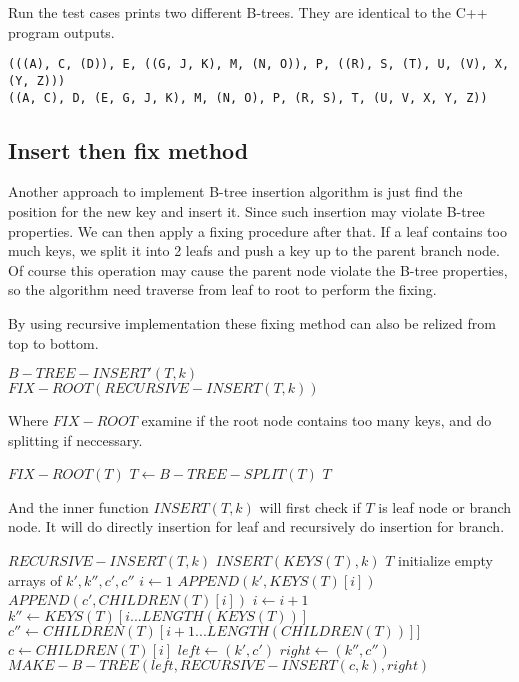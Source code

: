 \documentclass{article}
\begin{document}
Run the test cases prints two different B-trees. They are identical 
to the C++ program outputs.

\begin{verbatim}
(((A), C, (D)), E, ((G, J, K), M, (N, O)), P, ((R), S, (T), U, (V), X, (Y, Z)))
((A, C), D, (E, G, J, K), M, (N, O), P, (R, S), T, (U, V, X, Y, Z))
\end{verbatim}

\subsection{Insert then fix method}
Another approach to implement B-tree insertion algorithm is just find
the position for the new key and insert it. Since such insertion may
violate B-tree properties. We can then apply a fixing procedure after
that. If a leaf contains too much keys, we split it into 2 leafs and
push a key up to the parent branch node. Of course this operation
may cause the parent node violate the B-tree properties, so the 
algorithm need traverse from leaf to root to perform the fixing.

By using recursive implementation these fixing method can also be
relized from top to bottom.

\begin{algorithmic}
\STATE $B-TREE-INSERT'(T, k)$
  \RETURN $FIX-ROOT(RECURSIVE-INSERT(T, k))$
\end{algorithmic}

Where $FIX-ROOT$ examine if the root node contains too many keys,
and do splitting if neccessary.

\begin{algorithmic}
\STATE $FIX-ROOT(T)$
    \STATE $T \leftarrow B-TREE-SPLIT(T)$
  \ENDIF
  \RETURN $T$
\end{algorithmic}

And the inner function $INSERT(T, k)$ will first check if $T$ 
is leaf node or branch node. It will do directly insertion for leaf
and recursively do insertion for branch.

\begin{algorithmic}
\STATE $RECURSIVE-INSERT(T, k)$
    \STATE $INSERT(KEYS(T), k)$
    \RETURN $T$
  \ELSE
    \STATE initialize empty arrays of $k', k'', c', c''$
    \STATE $i \leftarrow 1$
      \STATE $APPEND(k', KEYS(T)[i])$
      \STATE $APPEND(c', CHILDREN(T)[i])$
      \STATE $i \leftarrow i+1$
    \ENDWHILE
    \STATE $k'' \leftarrow KEYS(T)[i...LENGTH(KEYS(T))]$
    \STATE $c'' \leftarrow CHILDREN(T)[i+1...LENGTH(CHILDREN(T))]]$
    \STATE $c \leftarrow CHILDREN(T)[i]$
    \STATE $left \leftarrow (k', c')$
    \STATE $right \leftarrow (k'', c'')$
    \RETURN $MAKE-B-TREE(left, RECURSIVE-INSERT(c, k), right)$
  \ENDIF
\end{algorithmic}
\end{document}
